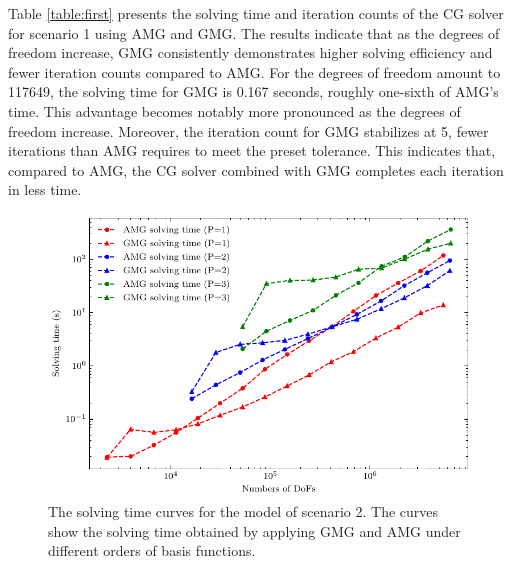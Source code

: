 \documentclass[extra, referee]{gji}
\begin{document}
Table \ref{table:first} presents the solving time and iteration counts of the CG
solver for scenario 1 using AMG and GMG. The results indicate that as the
degrees of freedom increase, GMG consistently demonstrates higher solving
efficiency and fewer iteration counts compared to AMG. For the degrees of
freedom amount to 117649, the solving time for GMG is 0.167 seconds, roughly
one-sixth of AMG's time. This advantage becomes notably more pronounced as the
degrees of freedom increase. Moreover, the iteration count for GMG stabilizes at
5, fewer iterations than AMG requires to meet the preset tolerance. This
indicates that, compared to AMG, the CG solver combined with GMG completes each
iteration in less time.
\begin{figure}
  \centering
  \includegraphics[width=0.8\linewidth]{fig/results_unstructured_model.pdf}
  \caption{The solving time curves for the model of scenario 2. The curves show the solving time obtained by applying GMG and AMG under different orders of basis functions. }
  \label{fig:results_unstructured_model}
\end{figure}
\end{document}
